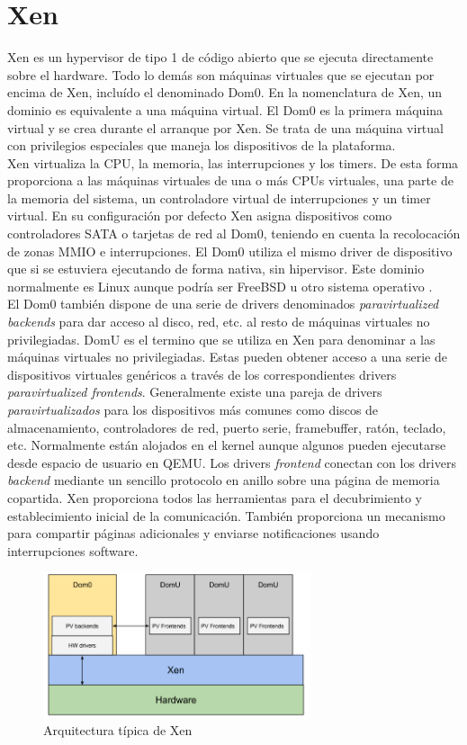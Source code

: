 \section{Xen}
Xen es un hypervisor de tipo 1 de código abierto que se ejecuta directamente sobre el hardware. Todo lo demás son máquinas virtuales que se ejecutan por encima de Xen, incluído el denominado Dom0. En la nomenclatura de Xen, un dominio es equivalente a una máquina virtual. El Dom0 es la primera máquina virtual y se crea durante el arranque por Xen. Se trata de una máquina virtual con privilegios especiales que maneja los dispositivos de la plataforma.\\
Xen virtualiza la CPU, la memoria, las interrupciones y los timers. De esta forma proporciona a las máquinas virtuales de una o más CPUs virtuales, una parte de la memoria del sistema, un controladore virtual de interrupciones y un timer virtual. En su configuración por defecto Xen asigna dispositivos como controladores SATA o tarjetas de red al Dom0, teniendo en cuenta la recolocación de zonas MMIO e interrupciones. El Dom0 utiliza el mismo driver de dispositivo que si se estuviera ejecutando de forma nativa, sin hipervisor. Este dominio normalmente es Linux aunque podría ser FreeBSD u otro sistema operativo \cite{xen_arm_whitepaper}.\\
El Dom0 también dispone de una serie de drivers denominados \textit{paravirtualized backends} para dar acceso al disco, red, etc. al resto de máquinas virtuales no privilegiadas. DomU es el termino que se utiliza en Xen para denominar a las máquinas virtuales no privilegiadas. Estas pueden obtener acceso a una serie de dispositivos virtuales genéricos a través de los correspondientes drivers \textit{paravirtualized frontends}. Generalmente existe una pareja de drivers \textit{paravirtualizados} para los dispositivos más comunes como discos de almacenamiento, controladores de red, puerto serie, framebuffer, ratón, teclado, etc. Normalmente están alojados en el kernel aunque algunos pueden ejecutarse desde espacio de usuario en QEMU. Los drivers \textit{frontend} conectan con los drivers \textit{backend} mediante un sencillo protocolo en anillo sobre una página de memoria copartida. Xen proporciona todos las herramientas para el decubrimiento y establecimiento inicial de la comunicación. También proporciona un mecanismo para compartir páginas adicionales y enviarse notificaciones usando interrupciones software\cite{xen_arm_whitepaper}.\\

\begin{figure}[!htb]
  \centering
  \includegraphics[width=0.70\textwidth]{recursos/xen_1.png}
  \caption{Arquitectura típica de Xen}
  \label{fig:xen_1}
\end{figure}

